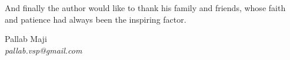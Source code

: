 \begin{acknowledgements}
\vspace{.5cm}
And finally the author would like to thank his family and friends, whose faith and patience had always been the inspiring factor.

\vspace{1cm}
\begin{flushright}
\large Pallab Maji\\
\small\textit{pallab.vsp@gmail.com}
\end{flushright}


\end{acknowledgements}


